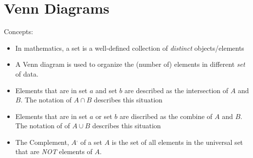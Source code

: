 \documentclass[11pt]{report}
\theoremstyle{remark}
\begin{document}
\section{Venn Diagrams}
Concepts:
\begin{itemize}
    \item In mathematics, a set is a well-defined collection of \textit{distinct} objects/elements
    \item A Venn diagram is used to organize the (number of) elements in different \textit{set} of data.
    \item Elements that are in set $a$ and set $b$ are described as the intersection of $A$ and $B$. The notation of $A \cap B$ describes this situation
    \item Elements that are in set $a$ or set $b$ are discribed as the combine of $A$ and $B$. The notation of of $A\cup B$ describes this situation
    \item The Complement, $A^{,}$ of a set $A$ is the set of all elements in the universal set that are \textit{NOT} elements of $A$.
\end{itemize}
\end{document}
